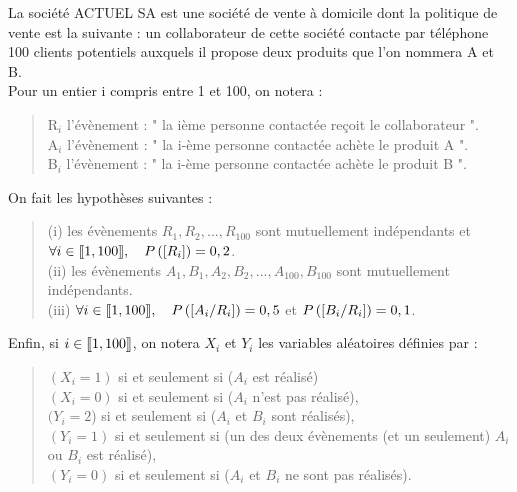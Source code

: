 \documentclass[11pt]{article}%
\begin{document}
La société ACTUEL SA est une société de vente à domicile dont la
politique
de vente est la suivante : un collaborateur de cette société contacte
par téléphone 100 clients potentiels auxquels il propose deux produits
que l'on
nommera A et B.\\
Pour un entier i compris entre 1 et 100, on notera :

\begin{quote}
\noindent R$_{i}$ l'évènement : {"} la ième personne contactée reçoit
le
collaborateur {"}.\\
A$_{i}$ l'évènement : {"} la i-ème personne contactée achète le produit
A {"}.\\
B$_{i}$ l'évènement : {"} la i-ème personne contactée achète le produit
B {"}.
\end{quote}

\noindent On fait les hypothèses suivantes :

\begin{quote}
\noindent (i) les évènements $R_{1},R_{2},...,R_{100}$ sont
mutuellement indépendants et $\forall i\in \lbrack
\hspace{-0.15em}[1,100]\hspace{-0.13em}],\quad P\left(\left[ {R_{i}} \right]\right)
= 0,2$.\\
(ii) les évènements $A_{1},B_{1},A_{2},B_{2},...,A_{100},B_{100}$ sont
mutuellement indépendants.\\
(iii) $\forall i\in \lbrack
\hspace{-0.15em}[1,100]\hspace{-0.13em}],\quad
P\left(\left[ {A_{i}/R_{i}} \right]\right) = 0,5$ et
$P\left(\left[ {B_{i}/R_{i}} \right]\right) = 0,1$.
\end{quote}

\noindent Enfin, si $i\in \lbrack
\hspace{-0.15em}[1,100]\hspace{-0.13em}]$,
on notera $X_{i}$ et $Y_{i}$ les variables aléatoires définies par :

\begin{quote}
\noindent $(X_{i} = 1)$ si et seulement si ($A_{i}$ est réalisé)\\
$(X_{i} = 0)$ si et seulement si ($A_{i}$ n'est pas réalisé),\\
$(Y_{i} = 2$) si et seulement si ($A_{i}$ et $B_{i}$ sont réalisés),\\
$(Y_{i} = 1)$ si et seulement si (un des deux évènements (et un
seulement) $A_{i}$ ou $B_{i}$ est réalisé),\\
$(Y_{i} = 0)$ si et seulement si ($A_{i}$ et $B_{i}$ ne sont pas
réalisés).
\end{quote}
\end{document}
